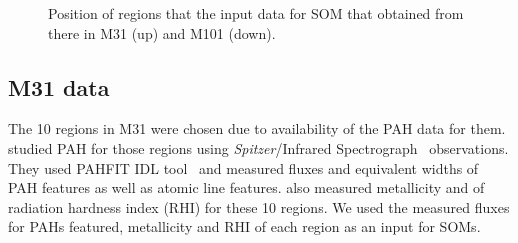   \begin{figure}
    \hfill
    \caption{Position of regions that the input data for SOM that obtained from there in M31 (up) and M101 (down).}
    \label{fig:dummy}
  \end{figure}
  
    \subsection{M31 data}
     \label{Sec: data_M31_SOMN} 
     
     The 10 regions in M31 were chosen due to availability of the PAH data for them. 
     \cite{Dim15} studied PAH for those regions using {\it Spitzer}/Infrared Spectrograph~\citep[IRS,][]{Houck04b} observations. 
     They used {\sc PAHFIT IDL} tool~\citep{Smith07b} and measured fluxes and equivalent widths of PAH features as well as atomic line features.
     \cite{Dim15} also measured metallicity and of radiation hardness index (RHI) for these 10 regions.
     We used the measured fluxes for PAHs featured, metallicity and RHI of each region as an input for SOMs.
     
